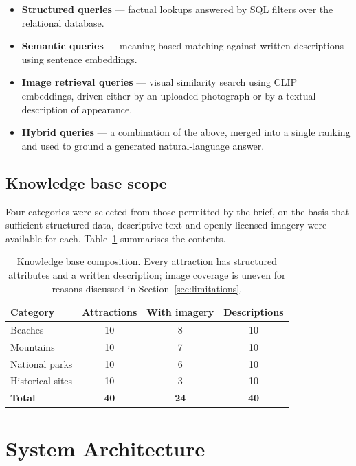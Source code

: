 \documentclass[11pt,a4paper]{article}
\begin{document}
\begin{itemize}[itemsep=2pt]
  \item \textbf{Structured queries} --- factual lookups answered by SQL filters
        over the relational database.
  \item \textbf{Semantic queries} --- meaning-based matching against written
        descriptions using sentence embeddings.
  \item \textbf{Image retrieval queries} --- visual similarity search using CLIP
        embeddings, driven either by an uploaded photograph or by a textual
        description of appearance.
  \item \textbf{Hybrid queries} --- a combination of the above, merged into a
        single ranking and used to ground a generated natural-language answer.
\end{itemize}

\subsection{Knowledge base scope}

Four categories were selected from those permitted by the brief, on the basis
that sufficient structured data, descriptive text and openly licensed imagery
were available for each. Table~\ref{tab:kb} summarises the contents.

\begin{table}[h]
\centering
\small
\begin{tabular}{lccc}
\toprule
\textbf{Category} & \textbf{Attractions} & \textbf{With imagery} & \textbf{Descriptions} \\
\midrule
Beaches           & 10 & 8 & 10 \\
Mountains         & 10 & 7 & 10 \\
National parks    & 10 & 6 & 10 \\
Historical sites  & 10 & 3 & 10 \\
\midrule
\textbf{Total}    & \textbf{40} & \textbf{24} & \textbf{40} \\
\bottomrule
\end{tabular}
\caption{Knowledge base composition. Every attraction has structured attributes
and a written description; image coverage is uneven for reasons discussed in
Section~\ref{sec:limitations}.}
\label{tab:kb}
\end{table}

\section{System Architecture}
\end{document}
